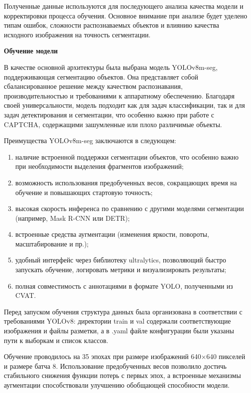 Полученные данные используются для последующего анализа качества модели и 
корректировки процесса обучения. Основное внимание при анализе будет уделено 
типам ошибок, сложности распознаваемых объектов и влиянию качества исходного 
изображения на точность сегментации.

\textbf{Обучение модели}

В качестве основной архитектуры была выбрана модель YOLOv8m-seg, поддерживающая 
сегментацию объектов. Она представляет собой сбалансированное решение между 
качеством распознавания, производительностью и требованиями к аппаратному 
обеспечению. Благодаря своей универсальности, модель подходит как для задач 
классификации, так и для задач детектирования и сегментации, что особенно важно 
при работе с CAPTCHA, содержащими зашумленные или плохо различимые объекты.

Преимущества YOLOv8m-seg заключаются в следующем:

\begin{enumerate}
    \item наличие встроенной поддержки сегментации объектов, что особенно важно 
    при необходимости выделения фрагментов изображений;
    \item возможность использования предобученных весов, сокращающих время на 
    обучение и повышающих стартовую точность;
    \item высокая скорость инференса по сравнению с другими моделями сегментации 
    (например, Mask R-CNN или DETR);
    \item встроенные средства аугментации (изменения яркости, повороты, 
    масштабирование и пр.);
    \item удобный интерфейс через библиотеку ultralytics, позволяющий быстро 
    запускать обучение, логировать метрики и визуализировать результаты;
    \item полная совместимость с аннотациями в формате YOLO, полученными из CVAT.
\end{enumerate}

Перед запуском обучения структура данных была организована в соответствии с 
требованиями YOLOv8: директории train и val содержали соответствующие изображения 
и файлы разметки, а в .yaml файле конфигурации были указаны пути к выборкам и 
список классов.

Обучение проводилось на 35 эпохах при размере изображений 640×640 пикселей и 
размере батча 8. Использование предобученных весов позволило достичь стабильного 
снижения функции потерь с первых эпох, а встроенные механизмы аугментации 
способствовали улучшению обобщающей способности модели.

